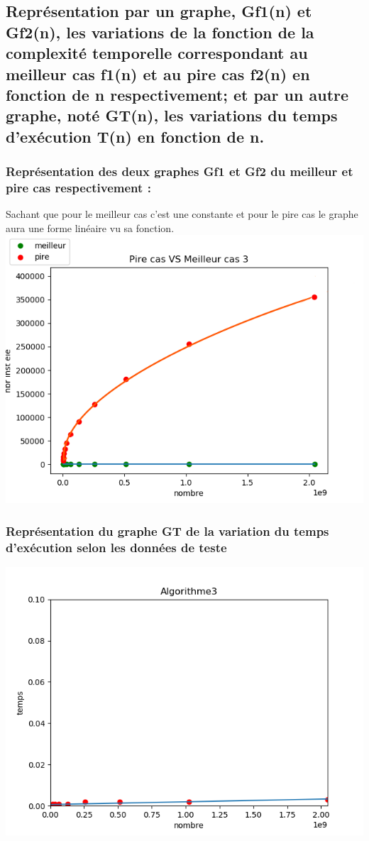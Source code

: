\documentclass[12pt]{article}
\begin{document}
\subsection{Représentation par un graphe, Gf1(n) et Gf2(n), les variations de la fonction de la complexité temporelle correspondant au meilleur cas f1(n) et au pire cas f2(n) en fonction de n respectivement; et par un autre graphe, noté GT(n), les variations  du temps d'exécution T(n) en fonction de n.}


\subsubsection{Représentation des deux graphes Gf1 et Gf2 du meilleur et pire cas respectivement :}
Sachant que pour le meilleur cas c'est une constante et pour le pire cas le graphe aura une forme linéaire vu sa fonction.
\\
\includegraphics[width=1\textwidth]{graphe/Pire_VS_Meilleur_cas3.png}

\subsubsection{Représentation du graphe GT de la variation du temps d'exécution selon les données de teste}

\includegraphics[width=1\textwidth]{graphe/Algorithme3.png}
\end{document}

